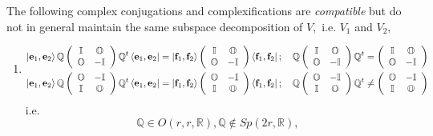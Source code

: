 \documentclass[aps,preprint]{revtex4}
\begin{document}
The following complex conjugations and complexifications are \emph{compatible%
} but do not in general maintain the same subspace decomposition of $V,$
i.e. $V_{1}$ and $V_{2},$

\begin{enumerate}
\item 
\begin{align}
\left\vert \mathbf{e}_{1},\mathbf{e}_{2}\right\rangle \mathbb{Q}\left( 
\begin{array}{cc}
\mathbb{I} & \mathbb{O} \\ 
\mathbb{O} & -\mathbb{I}%
\end{array}
\right) \mathbb{Q}^{t}\left\langle \mathbf{e}_{1},\mathbf{e}_{2}\right\vert
& =\left\vert \mathbf{f}_{1},\mathbf{f}_{2}\right\rangle \left( 
\begin{array}{cc}
\mathbb{I} & \mathbb{O} \\ 
\mathbb{O} & -\mathbb{I}%
\end{array}
\right) \left\langle \mathbf{f}_{1},\mathbf{f}_{2}\right\vert ;\quad \mathbb{%
Q}\left( 
\begin{array}{cc}
\mathbb{I} & \mathbb{O} \\ 
\mathbb{O} & -\mathbb{I}%
\end{array}
\right) \mathbb{Q}^{t}=\left( 
\begin{array}{cc}
\mathbb{I} & \mathbb{O} \\ 
\mathbb{O} & -\mathbb{I}%
\end{array}
\right) \\
\left\vert \mathbf{e}_{1},\mathbf{e}_{2}\right\rangle \mathbb{Q}\left( 
\begin{array}{cc}
\mathbb{O} & -\mathbb{I} \\ 
\mathbb{I} & \mathbb{O}%
\end{array}
\right) \mathbb{Q}^{t}\left\langle \mathbf{e}_{1},\mathbf{e}_{2}\right\vert
& =\left\vert \mathbf{f}_{1},\mathbf{f}_{2}\right\rangle \left( 
\begin{array}{cc}
\mathbb{O} & -\mathbb{I} \\ 
\mathbb{I} & \mathbb{O}%
\end{array}
\right) \left\langle \mathbf{f}_{1},\mathbf{f}_{2}\right\vert ;\quad \mathbb{%
Q}\left( 
\begin{array}{cc}
\mathbb{O} & -\mathbb{I} \\ 
\mathbb{I} & \mathbb{O}%
\end{array}
\right) \mathbb{Q}^{t}\neq\left( 
\begin{array}{cc}
\mathbb{O} & -\mathbb{I} \\ 
\mathbb{I} & \mathbb{O}%
\end{array}
\right)
\end{align}
i.e. 
\begin{equation}
\mathbb{Q}\in O\left( r,r,\mathbb{R}\right) ,\mathbb{Q}\notin Sp\left( 2r,%
\mathbb{R}\right) ,
\end{equation}


\end{enumerate}
\end{document}
